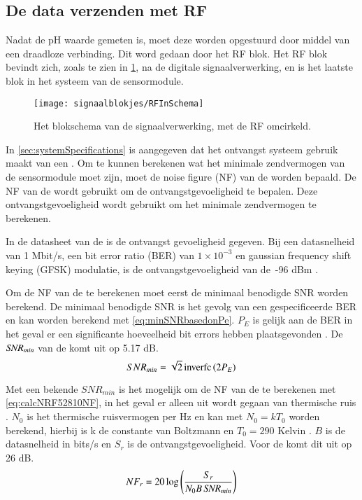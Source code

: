 \subsection{De data verzenden met RF} \label{sec:ontwerp:Rf}
Nadat de pH waarde gemeten is, moet deze worden opgestuurd door middel van een draadloze verbinding. Dit word gedaan door het RF blok. Het RF blok bevindt zich, zoals te zien in \cref{fig:RFInSchema}, na de digitale signaalverwerking, en is het laatste blok in het systeem van de sensormodule.
\begin{figure}[!htbp]
    \centering
    \texttt{[image: signaalblokjes/RFInSchema]}
    \caption{Het blokschema van de signaalverwerking, met de RF omcirkeld.}
    \label{fig:RFInSchema}
\end{figure}

In \cref{sec:systemSpecifications} is aangegeven dat het ontvangst systeem gebruik maakt van een \mcu. Om te kunnen berekenen wat het minimale zendvermogen van de sensormodule moet zijn, moet de noise figure (NF) van de \mcu worden bepaald. De NF van de \mcu wordt gebruikt om de ontvangstgevoeligheid te bepalen. Deze ontvangstgevoeligheid wordt gebruikt om het minimale zendvermogen te berekenen.

In de datasheet van de \mcu is de ontvangst gevoeligheid gegeven. Bij een datasnelheid van 1 Mbit/s, een bit error ratio (BER) van  $1 \times 10^{-3}$ en gaussian frequency shift keying (GFSK) modulatie, is de ontvangstgevoeligheid van de \mcu$\,$-96 dBm \cite{nrf52810}.

Om de NF van de \mcu te berekenen moet eerst de minimaal benodigde SNR worden berekend. De minimaal benodigde SNR is het gevolg van een gespecificeerde BER en kan worden berekend met \cref{eq:minSNRbasedonPe}. $P_E$ is gelijk aan de BER in het geval er een significante hoeveelheid bit errors hebben plaatsgevonden \cite{BERtoPe}. De $\mbox{\textit{SNR}}_{min}$ van de \mcu komt uit op 5.17 dB.
\begin{equation}\label{eq:minSNRbasedonPe}
    SNR_{min}=\sqrt{2}\inverfc\left(2P_E\right)
    \tagaddtext{[\si{\decibel}]}
\end{equation}

Met een bekende $SNR_{min}$ is het mogelijk om de NF van de \mcu te berekenen met \cref{eq:calcNRF52810NF}, in het geval er alleen uit wordt gegaan van thermische ruis \cite{SWRA030}. $N_0$ is het thermische ruisvermogen per Hz en kan met $N_0=kT_0$ worden berekend, hierbij is k de constante van Boltzmann en $T_0=290$ Kelvin \cite{Short-rangeWirelessCommunication}. $B$ is de datasnelheid in bits/s en $S_r$ is de ontvangstgevoeligheid. Voor de \mcu komt dit uit op 26 dB.
\begin{equation}\label{eq:calcNRF52810NF}
    NF_r=20\log\left(\frac{S_{r}}{N_0B\,\SNR_{min}}\right)
    \tagaddtext{[\si{\decibel}]}
\end{equation}

